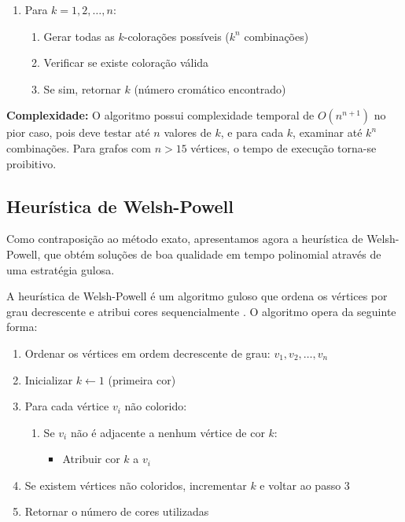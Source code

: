 \documentclass[12pt]{article}
\begin{document}
\begin{enumerate}
    \item Para $k = 1, 2, \ldots, n$:
    \begin{enumerate}
        \item Gerar todas as $k$-colorações possíveis ($k^n$ combinações)
        \item Verificar se existe coloração válida
        \item Se sim, retornar $k$ (número cromático encontrado)
    \end{enumerate}
\end{enumerate}

\textbf{Complexidade:} O algoritmo possui complexidade temporal de $O(n^{n+1})$ no pior caso, pois deve testar até $n$ valores de $k$, e para cada $k$, examinar até $k^n$ combinações. Para grafos com $n > 15$ vértices, o tempo de execução torna-se proibitivo.

\subsection{Heurística de Welsh-Powell}

Como contraposição ao método exato, apresentamos agora a heurística de Welsh-Powell, que obtém soluções de boa qualidade em tempo polinomial através de uma estratégia gulosa.

A heurística de Welsh-Powell é um algoritmo guloso que ordena os vértices por grau decrescente e atribui cores sequencialmente \cite{boaventura2002grafos}. O algoritmo opera da seguinte forma:

\begin{enumerate}
    \item Ordenar os vértices em ordem decrescente de grau: $v_1, v_2, \ldots, v_n$
    \item Inicializar $k \leftarrow 1$ (primeira cor)
    \item Para cada vértice $v_i$ não colorido:
    \begin{enumerate}
        \item Se $v_i$ não é adjacente a nenhum vértice de cor $k$:
        \begin{itemize}
            \item Atribuir cor $k$ a $v_i$
        \end{itemize}
    \end{enumerate}
    \item Se existem vértices não coloridos, incrementar $k$ e voltar ao passo 3
    \item Retornar o número de cores utilizadas
\end{enumerate}
\end{document}
